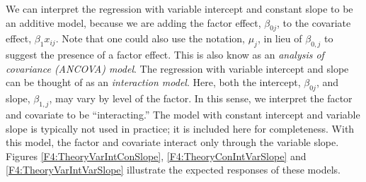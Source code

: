 We can interpret the regression with variable intercept and constant
slope to be an additive model, because we are adding the factor
effect, $\beta_{0j}$, to the covariate effect, $\beta_1x_{ij}$. Note
that one could also use the notation, $\mu_j$, in lieu of $\beta
_{0,j}$ to suggest the presence of a factor effect. This is also
know as an \emph{analysis of covariance (ANCOVA) model}. The
regression with variable intercept and slope can be thought of as an
\emph{interaction model}. Here, both the intercept, $\beta_{0j}$,
and slope, $\beta_{1,j}$, may vary by level of the factor. In this
sense, we interpret the factor and covariate to be ``interacting.''
The model with constant intercept and variable slope is typically
not used in practice; it is included here for completeness. With
this model, the factor and covariate interact only through the
variable slope. Figures \ref{F4:TheoryVarIntConSlope},
\ref{F4:TheoryConIntVarSlope} and \ref{F4:TheoryVarIntVarSlope}
illustrate the expected responses of these models.



